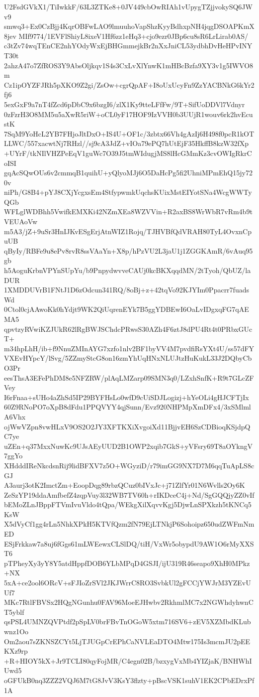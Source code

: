 U2FsdGVkX1/TiIwkkF/63L3ZTKe8+0JV449cbOwRIAh1vUpygTZjjvokySQ6JWv9
smwq3+Ex0CzBjj4KqrOBFwLAO9lmuuhoVapShzKyyBdhxpNH4jqgDSOAPKmX8jev
MIf9774/1EVFlShiyL8ixeV1Hf6zz1eHq3+cjo9ezr0JBp6cu8sR6LrLirab0AS/
c3tZv74wqTEnCE2nhYOdyWxEjBHGmmejkBr2nXxJniCL53ydbhDvHeHPvINYT30t
2ahzA47o7ZfROS3Y9AbsOljkqv1S4s3CxLvXlYnwK1mHBcBzfa9XY3v1g5IWVO8m
Cz1ipOYZFJRh5pXKO9Z2gi/ZsOw+cgrQpAF+I8oUxUcyFn9ZzYACBNkG6kYr2fj6
5exGxF9a7nT4fZcd6pDbC9x6bzgI6/zlX1Ky9tteLFfFw/9T+SifUoDDVl7Vdnyr
0zFzrH3O8MM5u5aXwR5riW+oCL0yF17HOF9IzVVH0b3UUjR1wouv6rk2hvEcustK
7SqM9YoHcL2YB7FHjoJltDxO+IS4U+OF1c/3zbtx66Vh4gAzIj6H498f0pcR1kOT
LLWC/557xacwtNj7RHzl//sj9cA3JdZ+vIOa79ePQ7hUtEjF35HkffB8kzW32fXp
+UYrF/tkNIlVHZPeEqV1guWc7O39J5tmWIdugjMS8lHcGMmKz3cvOWIgRkrCoISI
gqAcSQwOUs6v2cmmqB1quihU+yQlyoMJj6O5DaHcPg5fi2UhniMPmEhQ15jy720v
niPh/G8B4+pYJ8CXjYcgxsEm4StfypwmkUqchsKUixMstEIYotSNa4WcgWWTyQGb
WFLglWDBhh5VwifkEMXKi42NZmXEa8WZVVin+R2axBS8WrWbR7vRm4b9tVEUAoVw
m5A3/jZ+9uSr3HnIJKvESgErjAtnWIZ1Rojq/TJHVBfQdVRAH80TyL4OvxnCpuUB
qByIy/RBFe9u8ePv8rvR8ssVAaYn+X8p/hPzVU2L3jaU1j1ZGGKAmR/6vAuq95gb
h5AoguKrbnVPYnSUpYu/b9PnpydwvveCAUj0kcBKXqqdMN/2tTyoh/QbUZ/laDUR
1XMDDUVrB1FNtJ1D6zOdcun341RQ/8oBj+z+42tqVo92KJYIm0Ppacrr7fuadsWd
0Ctol0cjAAwoKk0hYdjt9WK2QiUqrenEYk7B5ggYDBEwI6OaLvIDgxqFG7qAEMA5
qpvtzyRVwiKZJUkR62lRgBWJSChdcPRwsS30AZh4F6ztJ8dPU4Rt4t0PRbxGUcT+
m34hpLhH/ib+f9NnuZMInAYG7xzfo1nlv2BF1byVV4M7pvdfiRsYXt4U/ss57dFY
VXEvHYpcY/lSvg/5ZZmyStcG8on16zmYhUqHNxNLUJtzHuKukL33J2DQbyCbO3Pr
eesThsA3EFePhDM8e5NFZRW/plAqLMZarp09SMN3q0/LZxhSnfK+R9t7GLcZFVey
I6rFnaa+sUHo4aZhSd5IP29BYFHsLo0wfD9cUiSDJLogizj+hYeOLi4gHJCFTjIx
60Z9RNoPO7oXpB8dFdu1PPQVYY4qjSunn/Evz920NHPMpXmDFx4/3xSMlmlA6Vhx
ojWwVZpn8vwHLxV9OS2O2JY3XFTKXiXvgoiXd11BjjvEH6SzCDBioqKSjdpQC7ye
uZEn+q37MxxNuwKc9UJsAEyUUD2B1OWP2xqib7GkS+yVFsry69T8aOYkngV7ggYo
XHdddIReNkcdsnRij9lidBFXV7z5O+WGyziD/r79imGG9NX7D7M6qqTuApLS8cGJ
A3aurj3otK2ImctZm+EoopDqg89rbzQCuz0bIVxJc+j71ZlfYr01N6Wvlls2Oy6K
ZeSzYP19ddaAmfbefZ4zqpVuy3l32WB7TV60h+rIKDceC4j+Nd/SgGQQjyZZ0vIf
bEMoZLnJBppFTVmIvuVldo4tQpa/WEkgXilXqvvKgj5DjwLnSPXkzh5tKNCq5KsW
X5dVyCf1gg4rLn5NhkXPkH5KTVfQzm2fN79EjLTNkjP6Sohoipz650udZWFmNmED
ESjFrkkaw7a8uj6fGgs61mLWEewxCLSlDQ/tiH/VxWr5obypdU9AW1O6rMyXXST6
pTPheyXy3yY8Y5atdHppfDOB6YLbMPqD4GSJI/ijU319R46seapo9XhH0MPkz+NX
5xA+ce2ool6ORcV+sFJIoZrSVl2JKJWrrC8RO3SvbkUl2gFCCjYWJrM3YZEvUUf7
MKc7RtlFBVSx2HQgNGunhu0FAV96MoeEJHwbv2RkhmlMC7x2NGWhdyhwnCT5yblf
qsPSL4UMNZQVPtdf2pSpLV0brFBvTnOGoW5xtm716SV6+zEV5XZMbdKLubwnz1Oo
Om2aou7sZKNSZCYt5LjTJUGpCrEPhCaNVLEaDTO4Mtw175Is3mcmJU2pEEKXz9rp
+R+HIOY5kX+Jr9TCLI80qyFojMR/C4egn02B/bzxygVxMb4YIZjaK/BNHWhIUwd5
oGFUkB0nq3ZZZ2VQJ6M7tG8JvV3KsY3flzty+pBscVSK1suhV1EK2CPbEDrxPf1A

